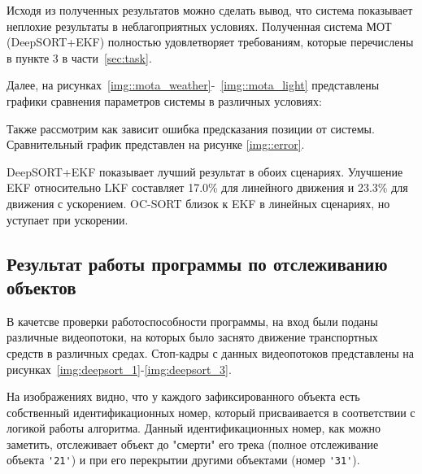 Исходя из полученных результатов можно сделать вывод, что система показывает неплохие результаты в неблагоприятных условиях. Полученная система МОТ (DeepSORT+EKF) полностью удовлетворяет требованиям, которые перечислены в пункте 3 в части~\ref{sec:task}. 

Далее, на рисунках~\ref{img::mota_weather}-~\ref{img::mota_light} представлены графики сравнения параметров системы в различных условиях:





Также рассмотрим как зависит ошибка предсказания позиции от системы. Сравнительный график представлен на рисунке \ref{img::error}.


DeepSORT+EKF показывает лучший результат в обоих сценариях. Улучшение EKF относительно LKF составляет 17.0\% для линейного движения и 23.3\% для движения с ускорением. OC-SORT близок к EKF в линейных сценариях, но уступает при ускорении.

\subsection{Результат работы программы по отслеживанию объектов}

В качетсве проверки работоспособности программы, на вход были поданы различные видеопотоки, на которых было заснято движение транспортных средств в различных средах. Стоп-кадры с данных видеопотоков представлены на рисунках~\ref{img:deepsort_1}-\ref{img:deepsort_3}.


На изображениях видно, что у каждого зафиксированного объекта есть собственный идентификационных номер, который присваивается в соответствии с логикой работы алгоритма. Данный идентификационных номер, как можно заметить, отслеживает объект до "смерти" его трека (полное отслеживание объекта \lstinline:'21':) и при его перекрытии другими объектами (номер  \lstinline:'31':).

